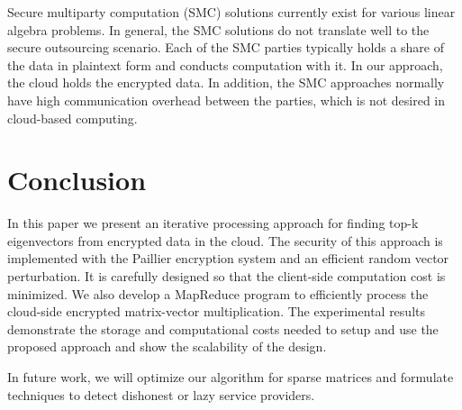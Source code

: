 \documentclass[10pt, conference, compsocconf]{IEEEtran}
\begin{document}
Secure multiparty computation (SMC) solutions \cite{nissim06, cramer01, kiltz07} currently exist for various linear algebra problems.  In general, the SMC solutions do not translate well to the secure outsourcing scenario. Each of the SMC parties typically holds a share of the data in plaintext form and conducts computation with it. In our approach, the cloud holds the encrypted data. In addition, the SMC approaches normally have high communication overhead between the parties, which is not desired in cloud-based computing.



\section{Conclusion}\label{sec:conclusion}
In this paper we present an iterative processing approach for finding top-k eigenvectors from encrypted data in the cloud. The security of this approach is implemented with the Paillier encryption system and an efficient random vector perturbation. It is carefully designed so that the client-side computation cost is minimized. We also develop a MapReduce program to efficiently process the cloud-side encrypted matrix-vector multiplication. The experimental results demonstrate the storage and computational costs needed to setup and use the proposed approach and show the scalability of the design. 

In future work, we will optimize our algorithm for sparse matrices and formulate techniques to detect dishonest or lazy service providers.




 
\end{document}
